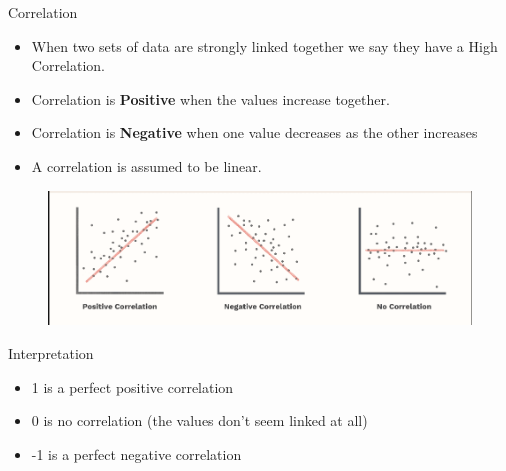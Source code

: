 \documentclass[10pt,dvipsnames, aspectratio=169]{beamer}
\begin{document}
\begin{frame}[t]{Correlation}
	\begin{itemize}
		\item When two sets of data are strongly linked together we say they 
		have a High Correlation.
		\item Correlation is \textbf{Positive} when the values increase 
		together.
		\item Correlation is \textbf{Negative} when one value decreases as the 
		other increases
		\item A correlation is assumed to be linear.	
	\end{itemize}
	
	\begin{figure} [ht]
		\centering
		\includegraphics[trim={1cm 0cm 1cmcm 1cm}, clip, scale=0.4]{eda/corr}
	\end{figure}
\end{frame}

\begin{frame}[t]{Interpretation}
	\begin{itemize}
		\item 1 is a perfect positive correlation
		\item 0 is no correlation (the values don't seem linked at all)
		\item -1 is a perfect negative correlation
	\end{itemize}
\end{frame}
\end{document}
